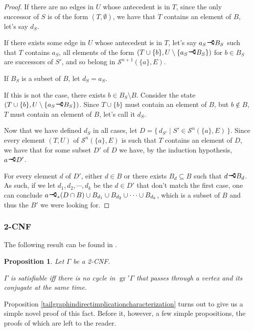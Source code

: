 \documentclass[11pt]{article}
\newcommand{\cS}{\mathcal{S}}
\DeclareMathOperator{\gr}{gr}
\newcommand{\rightcurveor}{
\!
\mathrel{
  \begin{tikzpicture}[scale=0.8]
    \draw[thick,->] (0,0) arc (90:150:-2ex);
    \draw[thick,->] (0,0) arc (90:30:2ex);
    \draw[thick] (-1ex, 0) -- (0.1ex,0);
  \end{tikzpicture}
}\!
}
\newtheorem*{prop*}{Proposition}
\begin{document}
\begin{proof}
If there are no edges in $U$ whose antecedent is in $T$, since the only successor of $S$ is of the form $(T, \emptyset)$, we have that $T$ contains an element of $B$, let's say $d_{S}$.

If there exists some edge in $U$ whose antecedent is in $T$, let's say $a_{S} \rightcurveor B_{S}$ such that $T$ contains $a_{S}$, all elements of the form $(T \cup \{b\}, U \setminus \{a_{S} \rightcurveor B_{S}\})$ for $b \in B_{S}$ are successors of $S'$, and so belong in $\cS^{n+1} (\{a\}, E)$.

If $B_S$ is a subset of $B$, let $d_S = a_S$.

If this is not the case, there exists $b \in B_S \setminus B$. Consider the state $(T \cup \{b\}, U \setminus \{a_{S} \rightcurveor B_{S}\})$. Since $T \cup \{b\}$ must contain an element of $B$, but $b \not \in B$, $T$ must contain an element of $B$, let's call it $d_S$.

Now that we have defined $d_S$ in all cases, let $D = \{\,d_{S'} \mid S' \in \cS^n (\{a\}, E)\,\}$. Since every element $(T, U)$ of $\cS^n (\{a\}, E)$ is such that $T$ contains an element of $D$, we have that for some subset $D'$ of $D$ we have, by the induction hypothesis, $a \rightcurveor D'$.

For every element $d$ of $D'$, either $d \in B$ or there exists $B_d \subseteq B$ such that $d \rightcurveor B_d$. As such, if we let $d_1, d_2, \cdots, d_k$ be the $d \in D'$ that don't match the first case, one can conclude $a \rightcurveor_* (D \cap B) \cup B_{d_1} \cup B_{d_2} \cup \cdots \cup B_{d_k}$, which is a subset of $B$ and thus the $B'$ we were looking for.

\end{proof}

\subsubsection{2-CNF}

The following result can be found in \cite{2cnf}.

\begin{prop*}
Let $\Gamma$ be a 2-CNF.

$\Gamma$ is satisfiable iff there is no cycle in $\gr' \Gamma$ that passes through a vertex and its conjugate at the same time.
\end{prop*}

Proposition \ref{tailgraphindirectimplicationcharacterization} turns out to give us a simple novel proof of this fact. Before it, however, a few simple propositions, the proofs of which are left to the reader.
\end{document}
